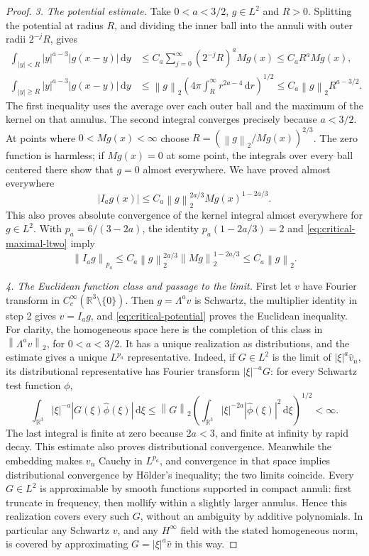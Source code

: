 \documentclass[11pt,a4paper]{article}
\theoremstyle{definition}\newtheorem{definition}[theorem]{Definition}
\theoremstyle{remark}\newtheorem{remark}[theorem]{Remark}
\newcommand{\R}{\mathbb R}\newcommand{\TT}{\mathbb T^3}
\newcommand{\dd}{\,\mathrm d}\newcommand{\eps}{\varepsilon}
\newcommand{\norm}[1]{\left\lVert#1\right\rVert}
\begin{document}
\begin{proof}
\emph{3. The potential estimate.}
Take $0<a<3/2$, $g\in L^2$ and $R>0$.  Splitting the potential at radius
$R$, and dividing the inner ball into the annuli with outer radii
$2^{-j}R$, gives
\begin{align*}
 \int_{|y|<R}|y|^{a-3}|g(x-y)|\dd y
 &\le C_a\sum_{j=0}^\infty(2^{-j}R)^a Mg(x)
 \le C_a R^a Mg(x),\\
 \int_{|y|\ge R}|y|^{a-3}|g(x-y)|\dd y
 &\le\norm{g}_2
       \left(4\pi\int_R^\infty r^{2a-4}\dd r\right)^{1/2}
 \le C_a\norm{g}_2 R^{a-3/2}.
\end{align*}
The first inequality uses the average over each outer ball and the maximum
of the kernel on that annulus.  The second integral converges precisely
because $a<3/2$.  At points where $0<Mg(x)<\infty$ choose
$R=(\norm{g}_2/Mg(x))^{2/3}$.  The zero function is harmless; if $Mg(x)=0$
at some point, the integrals over every ball centered there show that
$g=0$ almost everywhere.  We have proved almost everywhere
\[
 |I_ag(x)|\le C_a\norm{g}_2^{2a/3}Mg(x)^{1-2a/3}.
\]
This also proves absolute convergence of the kernel integral almost
everywhere for $g\in L^2$.  With $p_a=6/(3-2a)$, the identity
$p_a(1-2a/3)=2$ and \eqref{eq:critical-maximal-ltwo} imply
\begin{equation}\label{eq:critical-potential}
 \norm{I_ag}_{p_a}
 \le C_a\norm{g}_2^{2a/3}\norm{Mg}_2^{1-2a/3}
 \le C_a\norm{g}_2.
\end{equation}

\emph{4. The Euclidean function class and passage to the limit.}
First let $v$ have Fourier transform in
$C_c^\infty(\R^3\setminus\{0\})$.  Then $g=\Lambda^a v$ is Schwartz,
the multiplier identity in step 2 gives $v=I_ag$, and
\eqref{eq:critical-potential} proves the Euclidean inequality.
For clarity, the homogeneous space here is the completion of this class
in $\norm{\Lambda^a v}_2$, for $0<a<3/2$.  It has a unique realization as
distributions, and the estimate gives a unique $L^{p_a}$ representative.
Indeed, if $G\in L^2$ is the limit of $|\xi|^a\widehat v_n$, its
distributional representative has Fourier transform $|\xi|^{-a}G$:
for every Schwartz test function $\phi$,
\[
 \int_{\R^3}|\xi|^{-a}|G(\xi)\widehat\phi(\xi)|\dd\xi
 \le\norm{G}_2
      \left(\int_{\R^3}|\xi|^{-2a}|\widehat\phi(\xi)|^2\dd\xi\right)^{1/2}
 <\infty.
\]
The last integral is finite at zero because $2a<3$, and finite at infinity
by rapid decay.  This estimate also proves distributional convergence.
Meanwhile the embedding makes $v_n$ Cauchy in $L^{p_a}$, and convergence
in that space implies distributional convergence by H\"older's inequality;
the two limits coincide.  Every $G\in L^2$ is approximable by smooth
functions supported in compact annuli: first truncate in frequency, then
mollify within a slightly larger annulus.  Hence this realization covers
every such $G$, without an ambiguity by additive polynomials.  In
particular any Schwartz $v$, and any $H^\infty$ field with the stated
homogeneous norm, is covered by approximating
$G=|\xi|^a\widehat v$ in this way.


\end{proof}
\end{document}

